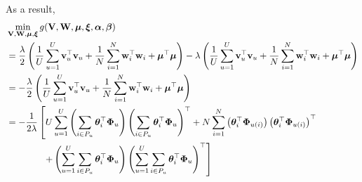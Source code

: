 As a result,
\begin{equation}
\label{eq:gmin}
\begin{aligned}
&\min_{\mathbf{V}, \mathbf{W}, \bm{\mu}, \bm{\xi}} g(\mathbf{V}, \mathbf{W}, \bm{\mu}, \bm{\xi}, {\bm{\alpha}}, {\bm{\beta}}) \\
&= \frac{\lambda}{2} \left( \frac{1}{U} \sum_{u=1}^U \mathbf{v}_u^\top \mathbf{v}_u 
     + \frac{1}{N} \sum_{i=1}^N \mathbf{w}_i^\top \mathbf{w}_i + \bm{\mu}^\top \bm{\mu} \right)
     -\lambda \left( \frac{1}{U} \sum_{u=1}^U \mathbf{v}_u^\top \mathbf{v}_u + \frac{1}{N} \sum_{i=1}^N \mathbf{w}_i^\top \mathbf{w}_i + \bm{\mu}^\top \bm{\mu} \right) \\
&= -\frac{\lambda}{2} \left( \frac{1}{U} \sum_{u=1}^U \mathbf{v}_u^\top \mathbf{v}_u + \frac{1}{N} \sum_{i=1}^N \mathbf{w}_i^\top \mathbf{w}_i + \bm{\mu}^\top \bm{\mu} \right) \\
&= -\frac{1}{2 \lambda} \left[
     U \sum_{u=1}^U \left( \sum_{i \in P_u} \bm{\theta}_i^\top \mathbf{\Phi}_u \right) \left( \sum_{i \in P_u} \bm{\theta}_i^\top \mathbf{\Phi}_u \right)^\top
   + N \sum_{i=1}^N \left( \bm{\theta}_i^\top \mathbf{\Phi}_{u(i)} \right) \left( \bm{\theta}_i^\top \mathbf{\Phi}_{u(i)} \right)^\top \right. \\
& \hspace{4em} \left.
   + \left( \sum_{u=1}^U \sum_{i \in P_u} \bm{\theta}_i^\top \mathbf{\Phi}_u \right)
     \left( \sum_{u=1}^U \sum_{i \in P_u} \bm{\theta}_i^\top \mathbf{\Phi}_u \right)^\top \right]
\end{aligned}
\end{equation}

